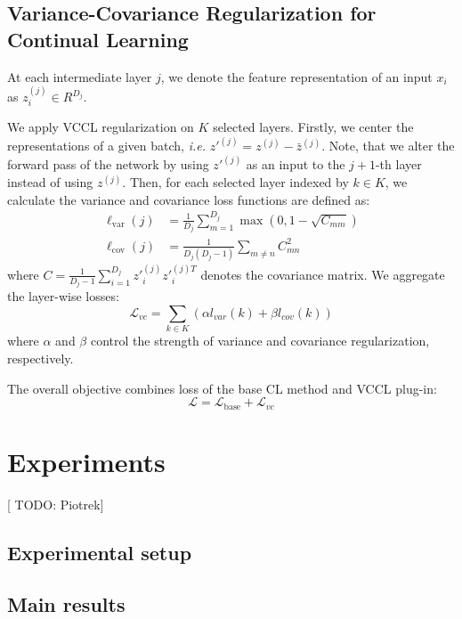 \documentclass{article}
\newcommand\TODO[1]{{\color{red} [ TODO: #1]}}
\begin{document}
\subsection{Variance-Covariance Regularization for Continual Learning}
At each intermediate layer $j$, we denote the feature representation of an input $x_i$ as $z_i^{(j)} \in R^{D_j}$. 

We apply VCCL regularization on $K$ selected layers. Firstly, we center the representations of a given batch, \textit{i.e.} $z'^{(j)} = z^{(j)} - \bar{z}^{(j)}$. Note, that we alter the forward pass of the network by using $z'^{(j)}$ as an input to the $j+1$-th layer instead of using $z^{(j)}$. Then, for each selected layer indexed by $k \in K$, we calculate the variance and covariance loss functions are defined as:
\begin{align}
\ell_{\mathrm{var}} (j) &= \frac{1}{D_j} \sum_{m=1}^{D_j} \max(0, 1 - \sqrt{C_{mm}}) \label{eq:var}\\
\ell_{\mathrm{cov}} (j) &= \frac{1}{D_j(D_j-1)} \sum_{m \neq n} C_{mn}^2 \label{eq:cov}
\end{align}
where \(C = \frac{1}{D_j-1}\sum_{i=1}^{D_j} z'^{(j)}_i z'^{(j)T}_i \) denotes the covariance matrix. We aggregate the layer-wise losses:
\begin{equation}
    \mathcal{L}_{vc} = \sum_{k \in K} (\alpha l_{var}(k) + \beta l_{cov}(k))
\end{equation}
where $\alpha$ and $\beta$ control the strength of variance and covariance regularization, respectively. 

The overall objective combines loss of the base CL method and VCCL plug-in:
\begin{equation}
    \mathcal{L} = \mathcal{L}_{\text{base}} + \mathcal{L}_{vc}
\end{equation}

\section{Experiments}

\TODO{Piotrek}


\subsection{Experimental setup}


\subsection{Main results}
\end{document}
